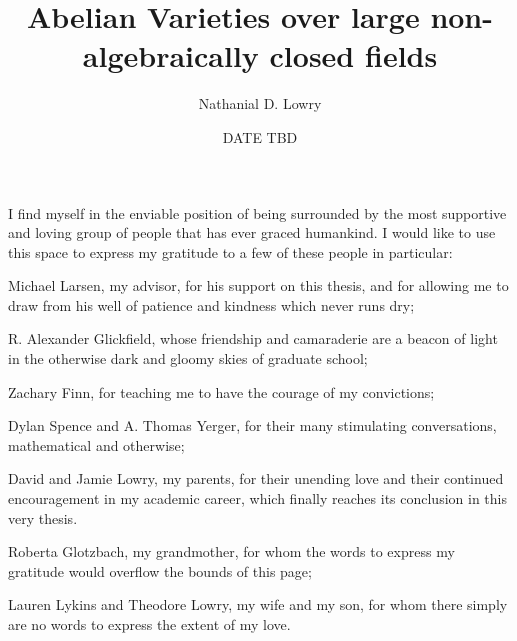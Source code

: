 \documentclass[showabstract,showacknowledgments,showpreface,showdedication,12pt]{iuphd}
\title{Abelian Varieties over large non-algebraically closed fields}
\author{Nathanial D. Lowry}
\date{DATE TBD} %
\begin{document}
\maketitle
\acceptancepage




\begin{acknowledgements}
I find myself in the enviable position of being surrounded by the most supportive and loving group of people that has ever graced humankind. I would like to use this space to express my gratitude to a few of these people in particular:

Michael Larsen, my advisor, for his support on this thesis, and for allowing me to draw from his well of patience and kindness which never runs dry;

R. Alexander Glickfield, whose friendship and camaraderie are a beacon of light in the otherwise dark and gloomy skies of graduate school;

Zachary Finn, for teaching me to have the courage of my convictions;

Dylan Spence and A. Thomas Yerger, for their many stimulating conversations, mathematical and otherwise;

David and Jamie Lowry, my parents, for their unending love and their continued encouragement in my academic career, which finally reaches its conclusion in this very thesis.

Roberta Glotzbach, my grandmother, for whom the words to express my gratitude would overflow the bounds of this page;

Lauren Lykins and Theodore Lowry, my wife and my son, for whom there simply are no words to express the extent of my love.
\end{acknowledgements}




\end{document}

